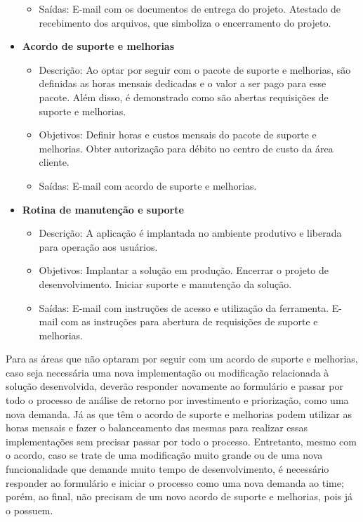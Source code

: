 \begin{itemize}
\begin{itemize}
			\item Saídas: E-mail com os documentos de entrega do projeto. Atestado de recebimento dos arquivos, que simboliza o encerramento do projeto.
		\end{itemize}
		\item \textbf{Acordo de suporte e melhorias}
		\begin{itemize}
			\item Descrição: Ao optar por seguir com o pacote de suporte e melhorias, são definidas as horas mensais dedicadas e o valor a ser pago para esse pacote. Além disso, é demonstrado como são abertas requisições de suporte e melhorias.
			\item Objetivos: Definir horas e custos mensais do pacote de suporte e melhorias. Obter autorização para débito no centro de custo da área cliente.
			\item Saídas: E-mail com acordo de suporte e melhorias.
		\end{itemize}
		\item \textbf{Rotina de manutenção e suporte}
		\begin{itemize}
			\item Descrição: A aplicação é implantada no ambiente produtivo e liberada para operação aos usuários.
			\item Objetivos: Implantar a solução em produção. Encerrar o projeto de desenvolvimento. Iniciar suporte e manutenção da solução.
			\item Saídas: E-mail com instruções de acesso e utilização da ferramenta. E-mail com as instruções para abertura de requisições de suporte e melhorias.
		\end{itemize}
	\end{itemize}

	Para as áreas que não optaram por seguir com um acordo de suporte e melhorias, caso seja necessária uma nova implementação ou modificação relacionada à solução desenvolvida, deverão responder novamente ao formulário e passar por todo o processo de análise de retorno por investimento e priorização, como uma nova demanda.
	Já as que têm o acordo de suporte e melhorias podem utilizar as horas mensais e fazer o balanceamento das mesmas para realizar essas implementações sem precisar passar por todo o processo. Entretanto, mesmo com o acordo, caso se trate de uma modificação muito grande ou de uma nova funcionalidade que demande muito tempo de desenvolvimento, é necessário responder ao formulário e iniciar o processo como uma nova demanda ao time; porém, ao final, não precisam de um novo acordo de suporte e melhorias, pois já o possuem.

